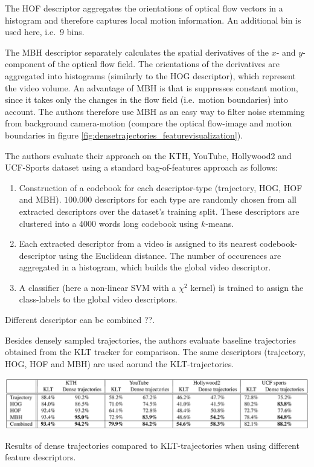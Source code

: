 The HOF descriptor aggregates the orientations of optical flow vectors in a histogram and therefore captures local motion information. An additional bin is used here, i.e.\ 9 bins.

The MBH descriptor separately calculates the spatial derivatives of the $x$- and $y$-component of the optical flow field.
The orientations of the derivatives are aggregated into histograms (similarly to the HOG descriptor), which represent the video volume.
An advantage of MBH is that is suppresses constant motion, since it takes only the changes in the flow field (i.e.\ motion boundaries) into account.
The authors therefore use MBH as an easy way to filter noise stemming from background camera-motion (compare the optical flow-image and motion boundaries in figure \ref{fig:densetrajectories_featurevisualization}).

The authors evaluate their approach on the KTH, YouTube, Hollywood2 and UCF-Sports dataset using a standard bag-of-features approach as follows:

\begin{enumerate}
    \item Construction of a codebook for each descriptor-type (trajectory, HOG, HOF and MBH).
        $100.000$ descriptors for each type are randomly chosen from all extracted descriptors over the dataset's training split.
        These descriptors are clustered into a 4000 words long codebook using $k$-means.
    \item Each extracted descriptor from a video is assigned to its nearest codebook-descriptor using the Euclidean distance.
        The number of occurences are aggregated in a histogram, which builds the global video descriptor.
    \item A classifier (here a non-linear SVM with a $\chi^2$ kernel) is trained to assign the class-labels to the global video descriptors.
\end{enumerate}

Different descriptor can be combined ??.

Besides densely sampled trajectories, the authors evaluate baseline trajectories obtained from the KLT tracker for comparison.
The same descriptors (trajectory, HOG, HOF and MBH) are used aorund the KLT-trajectories.

\begin{table}[H]
    \centering
    \includegraphics[width=\textwidth]{img_conventional/densetrajectories_results}
    \caption{Results of dense trajectories compared to KLT-trajectories when using different feature descriptors. \cite{wang_action_2011}}
    \label{tab:densetrajectories_results}
\end{table}

